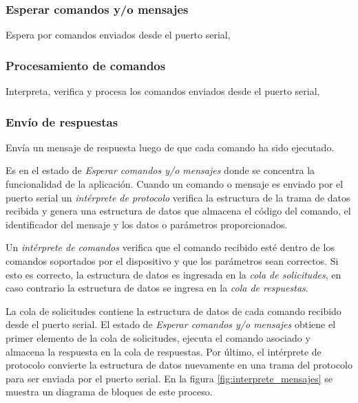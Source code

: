 \subsubsection{Esperar comandos y/o mensajes}

Espera por comandos enviados desde el puerto serial,

\subsubsection{Procesamiento de comandos}

Interpreta, verifica y procesa los comandos enviados desde el puerto serial,

\subsubsection{Envío de respuestas}

Envía un mensaje de respuesta luego de que cada comando ha sido ejecutado. 


Es en el estado de \textit{Esperar comandos y/o mensajes} donde se concentra la funcionalidad de la aplicación. Cuando un comando o mensaje es enviado por el puerto serial un \textit{intérprete de protocolo} verifica la estructura de la trama de datos recibida y genera una estructura de datos que almacena el código del comando, el identificador del mensaje y los datos o parámetros proporcionados. 

Un \textit{intérprete de comandos} verifica que el comando recibido esté dentro de los comandos soportados por el dispositivo y que los parámetros sean correctos. Si esto es correcto, la estructura de datos es ingresada en la \textit{cola de solicitudes}, en caso contrario la estructura de datos se ingresa en la \textit{cola de respuestas}. 

La cola de solicitudes contiene la estructura de datos de cada comando recibido desde el puerto serial. El estado de \textit{Esperar comandos y/o mensajes} obtiene el primer elemento de la cola de solicitudes, ejecuta el comando asociado y almacena la respuesta en la cola de respuestas. Por último, el intérprete de protocolo convierte la estructura de datos nuevamente en una trama del protocolo para ser enviada por el puerto serial. En la figura \ref{fig:interprete_mensajes} se muestra un diagrama de bloques de este proceso. 


